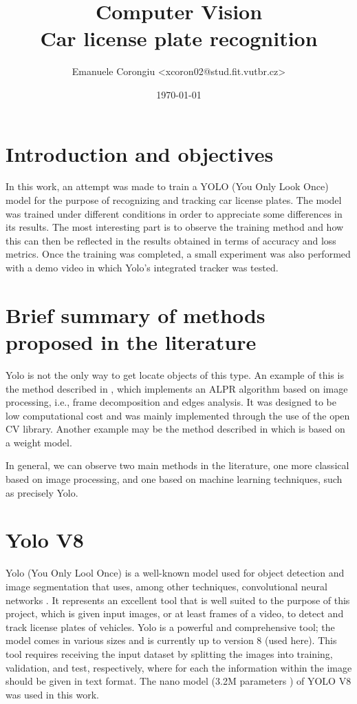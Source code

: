 \documentclass[12pt]{article}
\title{\textbf{Computer Vision \\
Car license plate recognition}}
\author{Emanuele Corongiu <xcoron02@stud.fit.vutbr.cz>}
\date{\today}
\begin{document}


\section{Introduction and objectives}
In this work, an attempt was made to train a YOLO (You Only Look Once) model for the purpose of recognizing and tracking car license plates. The model was trained under different conditions in order to appreciate some differences in its results. The most interesting part is to observe the training method and how this can then be reflected in the results obtained in terms of accuracy and loss metrics. Once the training was completed, a small experiment was also performed with a demo video in which Yolo's integrated tracker was tested.



\section{Brief summary of methods proposed in the literature}
Yolo is not the only way to get locate objects of this type. An example of this is the method described in \cite{9790745}, which implements an ALPR algorithm based on image processing, i.e., frame decomposition and edges analysis. It was designed to be low computational cost and was mainly implemented through the use of the open CV library. Another example may be the method described in \cite{9755690} which is based on a weight model.

In general, we can observe two main methods \cite{9755690} in the literature, one more classical based on image processing, and one based on machine learning techniques, such as precisely Yolo.
\clearpage

\section{Yolo V8}
Yolo (You Only Lool Once) \cite{yolo1} is a well-known model used for object detection and image segmentation that uses, among other techniques, convolutional neural networks \cite{CV_course_slide}. It represents an excellent tool that is well suited to the purpose of this project, which is given input images, or at least frames of a video, to detect and track license plates of vehicles. Yolo is a powerful and comprehensive tool; the model comes in various sizes and is currently up to version 8 (used here). This tool requires receiving the input dataset by splitting the images into training, validation, and test, respectively, where for each the information within the image should be given in text format. The nano model (3.2M parameters \cite{yolo1}) of YOLO V8 was used in this work.
\end{document}
